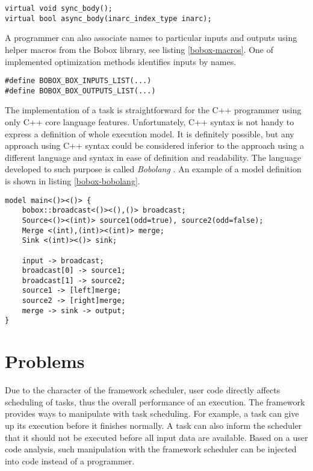 \begin{lstlisting}[caption={The code representation of the box action step.},label={bobox-action-step}]
virtual void sync_body();
virtual bool async_body(inarc_index_type inarc);
\end{lstlisting}

A programmer can also associate names to particular inputs and outputs using helper macros from the Bobox library, see listing \ref{bobox-macros}. One of implemented optimization methods identifies inputs by names.

\begin{lstlisting}[caption={Helper macros for mapping of names to inputs and outputs.},label={bobox-macros}]
#define BOBOX_BOX_INPUTS_LIST(...)
#define BOBOX_BOX_OUTPUTS_LIST(...)
\end{lstlisting}

The implementation of a task is straightforward for the C++ programmer using only C++ core language features. Unfortunately, C++ syntax is not handy to express a definition of whole execution model. It is definitely possible, but any approach using C++ syntax could be considered inferior to the approach using a different language and syntax in ease of definition and readability. The language developed to such purpose is called \emph{Bobolang} \cite{bobolang}. An example of a model definition is shown in listing \ref{bobox-bobolang}.

\begin{lstlisting}[caption={An example of the Bobolang usage.}, label={bobox-bobolang}]
model main<()><()> {
    bobox::broadcast<()><(),()> broadcast;
    Source<()><(int)> source1(odd=true), source2(odd=false);
    Merge <(int),(int)><(int)> merge;
    Sink <(int)><()> sink;
	
    input -> broadcast;
    broadcast[0] -> source1;
    broadcast[1] -> source2;
    source1 -> [left]merge;
    source2 -> [right]merge;
    merge -> sink -> output;
}
\end{lstlisting}

\section{Problems}
Due to the character of the framework scheduler, user code directly affects scheduling of tasks, thus the overall performance of an execution. The framework provides ways to manipulate with task scheduling. For example, a task can give up its execution before it finishes normally. A task can also inform the scheduler that it should not be executed before all input data are available. Based on a user code analysis, such manipulation with the framework scheduler can be injected into code instead of a programmer.
